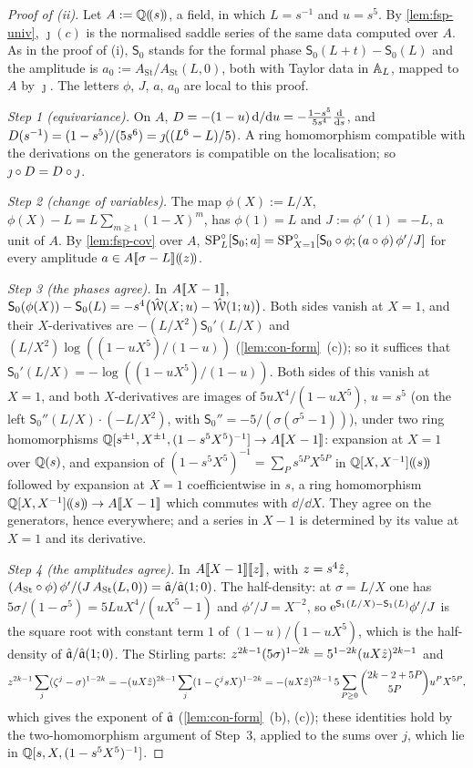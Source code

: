 
\begin{proof}[Proof of (ii)]
Let $A:=\mathbb{Q}(\!(s)\!)$, a field, in which $L=s^{-1}$ and $u=s^5$. By \cref{lem:fsp-univ}, $\jmath(c)$ is the normalised saddle series of the same data computed over $A$. As in the proof of (i), $\mathsf S_0$ stands for the formal phase $\mathsf S_0(L+t)-\mathsf S_0(L)$ and the amplitude is $a_0:=A_{\mathrm{St}}/A_{\mathrm{St}}(L,0)$, both with Taylor data in $\mathbb{A}_{L}$, mapped to $A$ by $\jmath$. The letters $\phi$, $J$, $a$, $a_0$ are local to this proof.

\emph{Step 1 (equivariance).} On $A$, $D=-(1-u)\,\mathrm{d}/\mathrm{d} u=-\frac{1-s^5}{5s^4}\frac{\mathrm{d}}{\mathrm{d} s}$, and $D(s^{-1})=(1-s^5)/(5s^6)=\jmath((L^6-L)/5)$. A ring homomorphism compatible with the derivations on the generators is compatible on the localisation; so $\jmath\circ D=D\circ\jmath$.

\emph{Step 2 (change of variables).} The map $\phi(X):=L/X$, $\phi(X)-L=L\sum_{m\geq1}(1-X)^m$, has $\phi(1)=L$ and $J:=\phi'(1)=-L$, a unit of $A$. By \cref{lem:fsp-cov} over $A$, $\mathrm{SP}^{\circ}_L[\mathsf S_0;a]=\mathrm{SP}^{\circ}_{X=1}[\mathsf S_0\circ\phi;(a\circ\phi)\,\phi'/J]$ for every amplitude $a\in A[\![ \sigma-L ]\!](\!(z)\!)$.

\emph{Step 3 (the phases agree).} In $A[\![ X-1 ]\!]$, $\mathsf S_0(\phi(X))-\mathsf S_0(L)=-s^4\bigl(\hat{\mathcal{W}}(X;u)-\hat{\mathcal{W}}(1;u)\bigr)$. Both sides vanish at $X=1$, and their $X$-derivatives are $-(L/X^2)\mathsf S_0'(L/X)$ and $(L/X^2)\log((1-uX^5)/(1-u))$ (\cref{lem:con-form}~(c)); so it suffices that $\mathsf S_0'(L/X)=-\log((1-uX^5)/(1-u))$. Both sides of this vanish at $X=1$, and both $X$-derivatives are images of $5uX^4/(1-uX^5)$, $u=s^5$ (on the left $\mathsf S_0''(L/X)\cdot(-L/X^2)$, with $\mathsf S_0''=-5/(\sigma(\sigma^5-1))$), under two ring homomorphisms $\mathbb{Q}[s^{\pm1},X^{\pm1},(1-s^5X^5)^{-1}]\to A[\![ X-1 ]\!]$: expansion at $X=1$ over $\mathbb{Q}(s)$, and expansion of $(1-s^5X^5)^{-1}=\sum_Ps^{5P}X^{5P}$ in $\mathbb{Q}[X,X^{-1}](\!(s)\!)$ followed by expansion at $X=1$ coefficientwise in $s$, a ring homomorphism $\mathbb{Q}[X,X^{-1}](\!(s)\!)\to A[\![ X-1 ]\!]$ which commutes with $\dd/\dd X$. They agree on the generators, hence everywhere; and a series in $X-1$ is determined by its value at $X=1$ and its derivative.

\emph{Step 4 (the amplitudes agree).} In $A[\![ X-1 ]\!][\![ z ]\!]$, with $z=s^4\hat{z}$, $(A_{\mathrm{St}}\circ\phi)\,\phi'/(J\,A_{\mathrm{St}}(L,0))=\hat{\mathfrak{a}}/\hat{\mathfrak{a}}(1;0)$. The half-density: at $\sigma=L/X$ one has $5\sigma/(1-\sigma^5)=5LuX^4/(uX^5-1)$ and $\phi'/J=X^{-2}$, so $\mathrm{e}^{\mathsf S_1(L/X)-\mathsf S_1(L)}\phi'/J$ is the square root with constant term $1$ of $(1-u)/(1-uX^5)$, which is the half-density of $\hat{\mathfrak{a}}/\hat{\mathfrak{a}}(1;0)$. The Stirling parts: $z^{2k-1}(5\sigma)^{1-2k}=5^{1-2k}(uX\hat{z})^{2k-1}$ and
\[
z^{2k-1}\sum_j(\zeta^j-\sigma)^{1-2k}=-(uX\hat{z})^{2k-1}\sum_j(1-\zeta^jsX)^{1-2k}=-(uX\hat{z})^{2k-1}\,5\sum_{P\geq0}\binom{2k-2+5P}{5P}u^PX^{5P},
\]
which gives the exponent of $\hat{\mathfrak{a}}$ (\cref{lem:con-form}~(b), (c)); these identities hold by the two-homomorphism argument of Step~3, applied to the sums over $j$, which lie in $\mathbb{Q}[s,X,(1-s^5X^5)^{-1}]$.


\end{proof}

